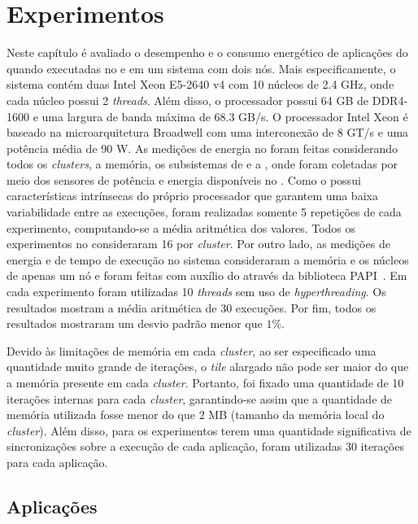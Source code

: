 \chapter{Experimentos}
\label{cha:experimentos}

Neste capítulo é avaliado o desempenho e o consumo energético de aplicações
\stencil do \pskel quando executadas no \mppa e em um sistema \numa com dois
nós. Mais especificamente, o sistema contém duas  Intel Xeon
E5-2640 v4 com 10 núcleos de 2.4 GHz, onde cada núcleo possui 2
\textit{threads}. Além disso, o processador possui
64 GB de \ram DDR4-1600 e uma largura de
banda máxima de 68.3 GB/s. O processador Intel Xeon é baseado na
microarquitetura Broadwell com uma interconexão \qpi de 8 GT/s e uma potência
média de 90 W. As medições de energia no \mppa
foram feitas considerando todos os \textit{clusters}, a memória, os subsistemas
de \es e a \noc, onde foram coletadas por meio dos sensores de potência e
energia disponíveis no \mppa. Como o \mppa possui características intrínsecas do
próprio processador que garantem uma baixa variabilidade entre as execuções, foram
realizadas somente 5 repetições de cada experimento, computando-se a média
aritmética dos valores. Todos os experimentos no \mppa consideraram 16
\pes por \textit{cluster}. Por outro lado, as medições de energia e de tempo de execução no
sistema \numa consideraram a memória e os núcleos de apenas um nó e foram feitas com auxílio do \rapl através da biblioteca
PAPI~\cite{papi12}. Em cada experimento foram utilizadas 10 \textit{threads} sem uso de
\textit{hyperthreading}. Os resultados mostram a média aritmética de 30
execuções. Por fim, todos os resultados mostraram um desvio padrão menor que
$1$\%.

Devido às limitações de memória em cada \textit{cluster}, ao ser especificado
uma quantidade muito grande de iterações, o \textit{tile} alargado não pode ser
maior do que a memória presente em cada \textit{cluster}. Portanto, foi fixado
uma quantidade de 10 iterações internas para cada \textit{cluster}, garantindo-se assim
que a quantidade de memória utilizada fosse menor do que 2 MB (tamanho da memória
local do \textit{cluster}). Além disso,
para os experimentos terem uma quantidade significativa de sincronizações sobre
a execução de cada aplicação, foram utilizadas 30 iterações para cada aplicação.

\section{Aplicações \stencil}
\label{cha:aplicacoes}


